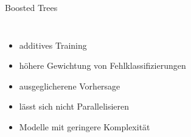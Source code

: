\documentclass[aspectratio=1610, professionalfonts, 9pt]{beamer}
\begin{document}
\begin{frame}{Boosted Trees}
\begin{columns}
	\begin{itemize}
	  \item additives Training
	  \item höhere Gewichtung von Fehlklassifizierungen
	  \item ausgeglicherene Vorhersage
	  \item lässt sich nicht Parallelisieren
	  \item Modelle mit geringere Komplexität
	\end{itemize}
  \end{columns}
\end{frame}
\end{document}
